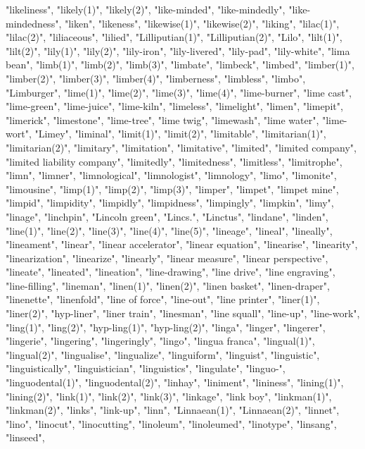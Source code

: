 "likeliness",
"likely(1)",
"likely(2)",
"like-minded",
"like-mindedly",
"like-mindedness",
"liken",
"likeness",
"likewise(1)",
"likewise(2)",
"liking",
"lilac(1)",
"lilac(2)",
"liliaceous",
"lilied",
"Lilliputian(1)",
"Lilliputian(2)",
"Lilo",
"lilt(1)",
"lilt(2)",
"lily(1)",
"lily(2)",
"lily-iron",
"lily-livered",
"lily-pad",
"lily-white",
"lima bean",
"limb(1)",
"limb(2)",
"limb(3)",
"limbate",
"limbeck",
"limbed",
"limber(1)",
"limber(2)",
"limber(3)",
"limber(4)",
"limberness",
"limbless",
"limbo",
"Limburger",
"lime(1)",
"lime(2)",
"lime(3)",
"lime(4)",
"lime-burner",
"lime cast",
"lime-green",
"lime-juice",
"lime-kiln",
"limeless",
"limelight",
"limen",
"limepit",
"limerick",
"limestone",
"lime-tree",
"lime twig",
"limewash",
"lime water",
"lime-wort",
"Limey",
"liminal",
"limit(1)",
"limit(2)",
"limitable",
"limitarian(1)",
"limitarian(2)",
"limitary",
"limitation",
"limitative",
"limited",
"limited company",
"limited liability company",
"limitedly",
"limitedness",
"limitless",
"limitrophe",
"limn",
"limner",
"limnological",
"limnologist",
"limnology",
"limo",
"limonite",
"limousine",
"limp(1)",
"limp(2)",
"limp(3)",
"limper",
"limpet",
"limpet mine",
"limpid",
"limpidity",
"limpidly",
"limpidness",
"limpingly",
"limpkin",
"limy",
"linage",
"linchpin",
"Lincoln green",
"Lincs.",
"Linctus",
"lindane",
"linden",
"line(1)",
"line(2)",
"line(3)",
"line(4)",
"line(5)",
"lineage",
"lineal",
"lineally",
"lineament",
"linear",
"linear accelerator",
"linear equation",
"linearise",
"linearity",
"linearization",
"linearize",
"linearly",
"linear measure",
"linear perspective",
"lineate",
"lineated",
"lineation",
"line-drawing",
"line drive",
"line engraving",
"line-filling",
"lineman",
"linen(1)",
"linen(2)",
"linen basket",
"linen-draper",
"linenette",
"linenfold",
"line of force",
"line-out",
"line printer",
"liner(1)",
"liner(2)",
"hyp-liner",
"liner train",
"linesman",
"line squall",
"line-up",
"line-work",
"ling(1)",
"ling(2)",
"hyp-ling(1)",
"hyp-ling(2)",
"linga",
"linger",
"lingerer",
"lingerie",
"lingering",
"lingeringly",
"lingo",
"lingua franca",
"lingual(1)",
"lingual(2)",
"lingualise",
"lingualize",
"linguiform",
"linguist",
"linguistic",
"linguistically",
"linguistician",
"linguistics",
"lingulate",
"linguo-",
"linguodental(1)",
"linguodental(2)",
"linhay",
"liniment",
"lininess",
"lining(1)",
"lining(2)",
"link(1)",
"link(2)",
"link(3)",
"linkage",
"link boy",
"linkman(1)",
"linkman(2)",
"links",
"link-up",
"linn",
"Linnaean(1)",
"Linnaean(2)",
"linnet",
"lino",
"linocut",
"linocutting",
"linoleum",
"linoleumed",
"linotype",
"linsang",
"linseed",
